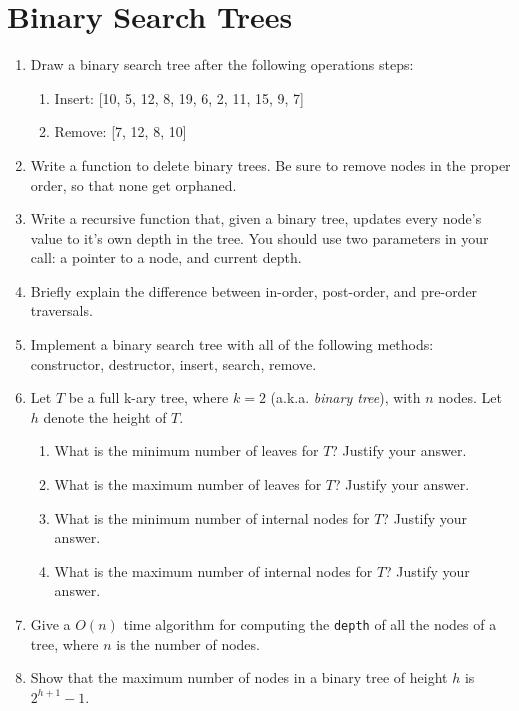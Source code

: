 \documentclass[11pt]{article}
\begin{document}
\section{Binary Search Trees}
\begin{enumerate}
    \item Draw a binary search tree after the following operations steps:
    \begin{enumerate}
        \item Insert: [10, 5, 12, 8, 19, 6, 2, 11, 15, 9, 7]
        \item Remove: [7, 12, 8, 10]
    \end{enumerate}
    
    \item Write a function to delete binary trees. Be sure to remove nodes in the proper order, so that none get orphaned.

    \item Write a recursive function that, given a binary tree, updates every node's value to it's own depth in the tree. You should use two parameters in your call: a pointer to a node, and current depth. 

    \item Briefly explain the difference between in-order, post-order, and pre-order traversals.

    \item Implement a binary search tree with all of the following methods: constructor, destructor, insert, search, remove.

    \item Let $T$ be a full k-ary tree, where $k=2$ (a.k.a. {\it binary tree}), with $n$ nodes.  Let $h$ denote the height of $T$.
    \begin{enumerate}
        \item What is the minimum number of leaves for $T$?  Justify your answer.
        \item What is the maximum number of leaves for $T$?  Justify your answer.
        \item What is the minimum number of internal nodes for $T$?  Justify your answer.
        \item What is the maximum number of internal nodes for $T$?  Justify your answer.
    \end{enumerate}

    \item Give a $O(n)$ time algorithm for computing the \verb|depth| of all the nodes of a tree, where $n$ is the number of nodes.

    \item Show that the maximum number of nodes in a binary tree of height $h$ is $2^{h+1}-1$.
\end{enumerate}

\label{r:lastpage}
\end{document}
